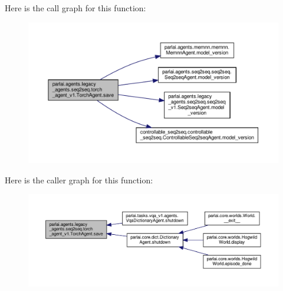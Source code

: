 Here is the call graph for this function\+:
\nopagebreak
\begin{figure}[H]
\begin{center}
\leavevmode
\includegraphics[width=350pt]{classparlai_1_1agents_1_1legacy__agents_1_1seq2seq_1_1torch__agent__v1_1_1TorchAgent_a4a01defa1d669571f574fcfe021776a8_cgraph}
\end{center}
\end{figure}
Here is the caller graph for this function\+:
\nopagebreak
\begin{figure}[H]
\begin{center}
\leavevmode
\includegraphics[width=350pt]{classparlai_1_1agents_1_1legacy__agents_1_1seq2seq_1_1torch__agent__v1_1_1TorchAgent_a4a01defa1d669571f574fcfe021776a8_icgraph}
\end{center}
\end{figure}
\mbox{\label{classparlai_1_1agents_1_1legacy__agents_1_1seq2seq_1_1torch__agent__v1_1_1TorchAgent_a3d922c4a8452c9e44fa2478e6fecdfd1}} 
